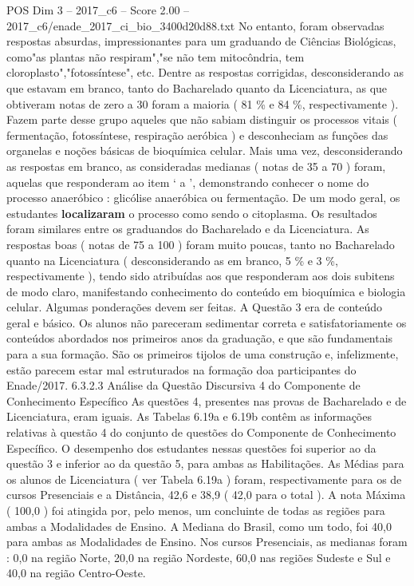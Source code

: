 \begin{textsample}{POS Dim 3 – 2017\_c6 – Score 2.00 – 2017\_c6/enade\_2017\_ci\_bio\_3400d20d88.txt}
No entanto, foram observadas respostas absurdas, impressionantes para um graduando de Ciências Biológicas, como"as plantas não respiram","se não tem mitocôndria, tem cloroplasto","fotossíntese", etc.
Dentre as respostas corrigidas, desconsiderando as que estavam em branco, tanto do Bacharelado quanto da Licenciatura, as que obtiveram notas de zero a 30 foram a maioria ( 81 \% e 84 \%, respectivamente ).
Fazem parte desse grupo aqueles que não sabiam distinguir os processos vitais ( fermentação, fotossíntese, respiração aeróbica ) e desconheciam as funções das organelas e noções básicas de bioquímica celular.
Mais uma vez, desconsiderando as respostas em branco, as consideradas medianas ( notas de 35 a 70 ) foram, aquelas que responderam ao item ‘ a ’, demonstrando conhecer o nome do processo anaeróbico : glicólise anaeróbica ou fermentação.
De um modo geral, os estudantes \textbf{localizaram} o processo como sendo o citoplasma.
Os resultados foram similares entre os graduandos do Bacharelado e da Licenciatura.
As respostas boas ( notas de 75 a 100 ) foram muito poucas, tanto no Bacharelado quanto na Licenciatura ( desconsiderando as em branco, 5 \% e 3 \%, respectivamente ), tendo sido atribuídas aos que responderam aos dois subitens de modo claro, manifestando conhecimento do conteúdo em bioquímica e biologia celular.
Algumas ponderações devem ser feitas.
A Questão 3 era de conteúdo geral e básico.
Os alunos não pareceram sedimentar correta e satisfatoriamente os conteúdos abordados nos primeiros anos da graduação, e que são fundamentais para a sua formação.
São os primeiros tijolos de uma construção e, infelizmente, estão parecem estar mal estruturados na formação doa participantes do Enade/2017. 6.3.2.3 Análise da Questão Discursiva 4 do Componente de Conhecimento Específico As questões 4, presentes nas provas de Bacharelado e de Licenciatura, eram iguais.
As Tabelas 6.19a e 6.19b contêm as informações relativas à questão 4 do conjunto de questões do Componente de Conhecimento Específico.
O desempenho dos estudantes nessas questões foi superior ao da questão 3 e inferior ao da questão 5, para ambas as Habilitações.
As Médias para os alunos de Licenciatura ( ver Tabela 6.19a ) foram, respectivamente para os de cursos Presenciais e a Distância, 42,6 e 38,9 ( 42,0 para o total ).
A nota Máxima ( 100,0 ) foi atingida por, pelo menos, um concluinte de todas as regiões para ambas a Modalidades de Ensino.
A Mediana do Brasil, como um todo, foi 40,0 para ambas as Modalidades de Ensino.
Nos cursos Presenciais, as medianas foram : 0,0 na região Norte, 20,0 na região Nordeste, 60,0 nas regiões Sudeste e Sul e 40,0 na região Centro-Oeste.

\end{textsample}
